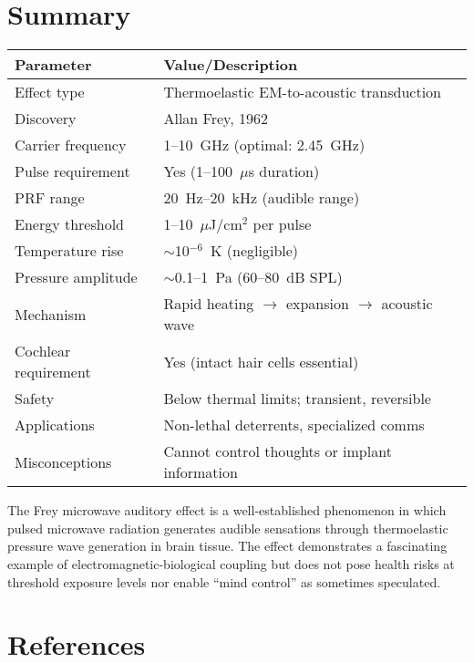 \section{Summary}

\begin{center}
\begin{tabular}{@{}ll@{}}
\toprule
\textbf{Parameter} & \textbf{Value/Description} \\
\midrule
Effect type & Thermoelastic EM-to-acoustic transduction \\
Discovery & Allan Frey, 1962 \\
Carrier frequency & 1--10~GHz (optimal: 2.45~GHz) \\
Pulse requirement & Yes (1--100~$\mu$s duration) \\
PRF range & 20~Hz--20~kHz (audible range) \\
Energy threshold & 1--10~$\mu$J/cm$^2$ per pulse \\
Temperature rise & $\sim$10$^{-6}$~K (negligible) \\
Pressure amplitude & $\sim$0.1--1~Pa (60--80~dB SPL) \\
Mechanism & Rapid heating $\rightarrow$ expansion $\rightarrow$ acoustic wave \\
Cochlear requirement & Yes (intact hair cells essential) \\
Safety & Below thermal limits; transient, reversible \\
Applications & Non-lethal deterrents, specialized comms \\
Misconceptions & Cannot control thoughts or implant information \\
\bottomrule
\end{tabular}
\end{center}

\begin{keyconcept}
The Frey microwave auditory effect is a well-established phenomenon in which pulsed microwave radiation generates audible sensations through thermoelastic pressure wave generation in brain tissue. The effect demonstrates a fascinating example of electromagnetic-biological coupling but does not pose health risks at threshold exposure levels nor enable ``mind control'' as sometimes speculated.
\end{keyconcept}

\section{References}

